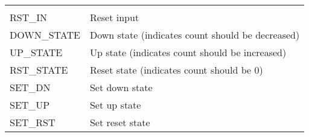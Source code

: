 \documentclass[11pt]{article}
\begin{document}
\begin{longtable}[]{@{}ll@{}}
\begin{minipage}[t]{0.05\columnwidth}
\end{minipage}\tabularnewline
\begin{minipage}[t]{0.05\columnwidth}\raggedright\strut
RST\_IN\strut
\end{minipage} & \begin{minipage}[t]{0.05\columnwidth}\raggedright\strut
Reset input\strut
\end{minipage}\tabularnewline
\begin{minipage}[t]{0.05\columnwidth}\raggedright\strut
DOWN\_STATE\strut
\end{minipage} & \begin{minipage}[t]{0.05\columnwidth}\raggedright\strut
Down state (indicates count should be decreased)\strut
\end{minipage}\tabularnewline
\begin{minipage}[t]{0.05\columnwidth}\raggedright\strut
UP\_STATE\strut
\end{minipage} & \begin{minipage}[t]{0.05\columnwidth}\raggedright\strut
Up state (indicates count should be increased)\strut
\end{minipage}\tabularnewline
\begin{minipage}[t]{0.05\columnwidth}\raggedright\strut
RST\_STATE\strut
\end{minipage} & \begin{minipage}[t]{0.05\columnwidth}\raggedright\strut
Reset state (indicates count should be 0)\strut
\end{minipage}\tabularnewline
\begin{minipage}[t]{0.05\columnwidth}\raggedright\strut
SET\_DN\strut
\end{minipage} & \begin{minipage}[t]{0.05\columnwidth}\raggedright\strut
Set down state\strut
\end{minipage}\tabularnewline
\begin{minipage}[t]{0.05\columnwidth}\raggedright\strut
SET\_UP\strut
\end{minipage} & \begin{minipage}[t]{0.05\columnwidth}\raggedright\strut
Set up state\strut
\end{minipage}\tabularnewline
\begin{minipage}[t]{0.05\columnwidth}\raggedright\strut
SET\_RST\strut
\end{minipage} & \begin{minipage}[t]{0.05\columnwidth}\raggedright\strut
Set reset state\strut
\end{minipage}\tabularnewline

\end{longtable}
\end{document}
